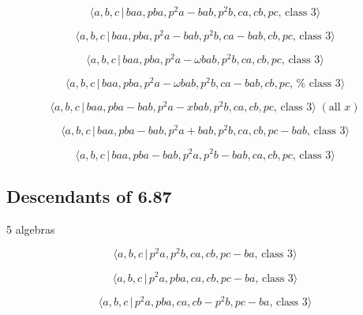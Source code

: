 \documentclass[10pt]{article}
\begin{document}
\begin{equation}
\langle a,b,c\,|\,baa,pba,p^2a-bab,p^2b,ca,cb,pc,\,\text{class }3\rangle 
\tag{7.2623}
\end{equation}

\begin{equation}
\langle a,b,c\,|\,baa,pba,p^2a-bab,p^2b,ca-bab,cb,pc,\,\text{class }3\rangle
\tag{7.2624}
\end{equation}

\begin{equation}
\langle a,b,c\,|\,baa,pba,p^{2}a-\omega bab,p^{2}b,ca,cb,pc,\,\text{class }%
3\rangle  \tag{7.2625}
\end{equation}

\begin{equation}
\langle a,b,c\,|\,baa,pba,p^{2}a-\omega bab,p^{2}b,ca-bab,cb,pc,\,\text{%
class }3\rangle  \tag{7.2626}
\end{equation}

\begin{equation}
\langle a,b,c\,|\,baa,pba-bab,p^2a-xbab,p^2b,ca,cb,pc,\,\text{class }%
3\rangle \;(\text{all }x)  \tag{7.2627}
\end{equation}

\begin{equation}
\langle a,b,c\,|\,baa,pba-bab,p^2a+bab,p^2b,ca,cb,pc-bab,\,\text{class }%
3\rangle  \tag{7.2628}
\end{equation}

\begin{equation}
\langle a,b,c\,|\,baa,pba-bab,p^2a,p^2b-bab,ca,cb,pc,\,\text{class }3\rangle
\tag{7.2629}
\end{equation}

\subsection{Descendants of 6.87}

5 algebras

\begin{equation}
\langle a,b,c\,|\,p^2a,p^2b,ca,cb,pc-ba,\,\text{class }3\rangle  \tag{7.2630}
\end{equation}

\begin{equation}
\langle a,b,c\,|\,p^2a,pba,ca,cb,pc-ba,\,\text{class }3\rangle  \tag{7.2631}
\end{equation}

\begin{equation}
\langle a,b,c\,|\,p^2a,pba,ca,cb-p^2b,pc-ba,\,\text{class }3\rangle 
\tag{7.2632}
\end{equation}
\end{document}
